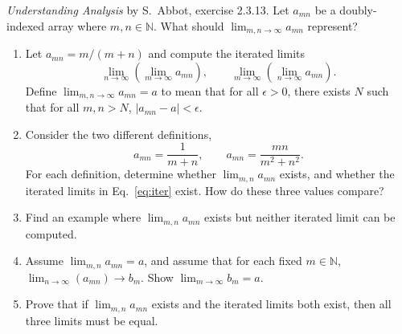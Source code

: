 \documentclass[12pt]{article}
\newcommand{\N}{\mathbb{N}}
\begin{document}
\begin{enumerate}
{    \textit{Understanding Analysis} by S.~Abbot, exercise 2.3.13.} Let $a_{mn}$
    be a doubly-indexed array where $m,n\in \N$. What should $\lim_{m,n\to
  \infty} a_{mn}$ represent?
    \begin{enumerate}
      \item Let $a_{mn} = m/(m+n)$ and compute the iterated limits
        \begin{equation}
          \lim_{n\to\infty} \left( \lim_{m \to \infty} a_{mn}\right), \qquad
          \lim_{m\to\infty} \left( \lim_{n \to \infty} a_{mn} \right).
          \label{eq:iter}
        \end{equation}
        Define $\lim_{m,n\to \infty} a_{mn} = a$ to mean that for all $\epsilon>0$,
        there exists $N$ such that for all $m,n >N$, $|a_{mn} - a|<\epsilon$.
      \item Consider the two different definitions,
        \begin{equation}
          a_{mn} = \frac{1}{m+n}, \qquad a_{mn} = \frac{mn}{m^2+n^2}.
        \end{equation}
        For each definition, determine whether $\lim_{m,n} a_{mn}$ exists, and
        whether the iterated limits in Eq.~\eqref{eq:iter} exist. How do these
        three values compare?
      \item Find an example where $\lim_{m,n} a_{mn}$ exists but neither
        iterated limit can be computed.
      \item Assume $\lim_{m,n} a_{mn} = a$, and assume that for each fixed
        $m\in \N$, $\lim_{n\to \infty} (a_{mn}) \to b_m$. Show $\lim_{m\to
        \infty} b_m = a$.
      \item Prove that if $\lim_{m,n} a_{mn}$ exists and the iterated limits
        both exist, then all three limits must be equal.
    \end{enumerate}
\end{enumerate}
\end{document}
